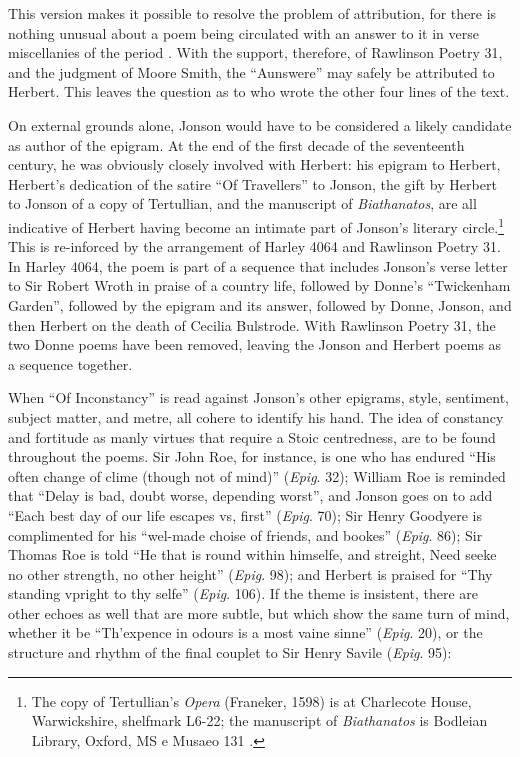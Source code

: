 \begin{paper}
This version makes it possible to resolve the problem of attribution,
for there is nothing unusual about a poem being circulated with an
answer to it in verse miscellanies of the period \citep{hart_answer-poem_1956,nixon_aske_1999}. With the support, therefore, of Rawlinson Poetry 31, and the
judgment of Moore Smith, the ``Aunswere'' may safely be attributed to
Herbert. This leaves the question as to who wrote the other four lines
of the text.

On external grounds alone, Jonson would have to be considered a likely
candidate as author of the epigram. At the end of the first decade of
the seventeenth century, he was obviously closely involved with Herbert:
his epigram to Herbert, Herbert's dedication of the satire ``Of
Travellers'' to Jonson, the gift by Herbert to Jonson of a copy of
Tertullian, and the manuscript of \emph{Biathanatos}, are all indicative
of Herbert having become an intimate part of Jonson's literary
circle.\footnote{The copy of Tertullian's \emph{Opera} (Franeker, 1598)
  is at Charlecote House, Warwickshire, shelfmark L6-22; the manuscript
  of \emph{Biathanatos} is Bodleian Library, Oxford, MS e Musaeo 131
 \citep{bland_jonson_1998}.} This is re-inforced by the arrangement of Harley 4064
and Rawlinson Poetry 31. In Harley 4064, the poem is part of a sequence
that includes Jonson's verse letter to Sir Robert Wroth in praise of a
country life, followed by Donne's ``Twickenham Garden'', followed by the
epigram and its answer, followed by Donne, Jonson, and then Herbert on
the death of Cecilia Bulstrode. With Rawlinson Poetry 31, the two Donne
poems have been removed, leaving the Jonson and Herbert poems as a
sequence together.

When ``Of Inconstancy'' is read against Jonson's other epigrams, style,
sentiment, subject matter, and metre, all cohere to identify his hand.
The idea of constancy and fortitude as manly virtues that require a Stoic
centredness, are to be found throughout the poems. Sir John Roe, for
instance, is one who has endured ``His often change of clime (though not
of mind)'' (\emph{Epig}. 32); William Roe is reminded that ``Delay is bad,
doubt worse, depending worst'', and Jonson goes on to add ``Each best day
of our life escapes vs, first'' (\emph{Epig}. 70); Sir Henry Goodyere is
complimented for his ``wel-made choise of friends, and bookes''
(\emph{Epig}. 86); Sir Thomas Roe is told ``He that is round within
himselfe, and streight, \textbar{} Need seeke no other strength, no
other height'' (\emph{Epig}. 98); and Herbert is praised for ``Thy
standing vpright to thy selfe'' (\emph{Epig}. 106). If the theme is
insistent, there are other echoes as well that are more subtle, but
which show the same turn of mind, whether it be ``Th'expence in odours is
a most vaine sinne'' (\emph{Epig}. 20), or the structure and rhythm of
the final couplet to Sir Henry Savile (\emph{Epig}. 95):


\end{paper}
